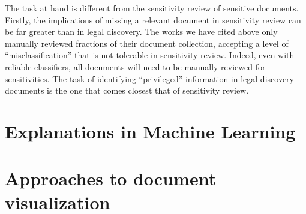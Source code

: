 \documentclass[\version]{l4proj}
\begin{document}
The task at hand is different from the sensitivity review of sensitive documents.
Firstly, the implications of missing a relevant document in sensitivity review can be far greater than in legal discovery.
The works we have cited above only manually reviewed fractions of their document collection, accepting a level of ``misclassification'' that is not tolerable in sensitivity review.
Indeed, even with reliable classifiers, all documents will need to be manually reviewed for sensitivities.
The task of identifying ``privileged'' information in legal discovery documents is the one that comes closest that of sensitivity review.

\section{Explanations in Machine Learning}


\autocite{ribeiroWhyShouldTrust2016}

\autocite{lundbergUnifiedApproachInterpreting2017}

\section{Approaches to document visualization}
\end{document}
